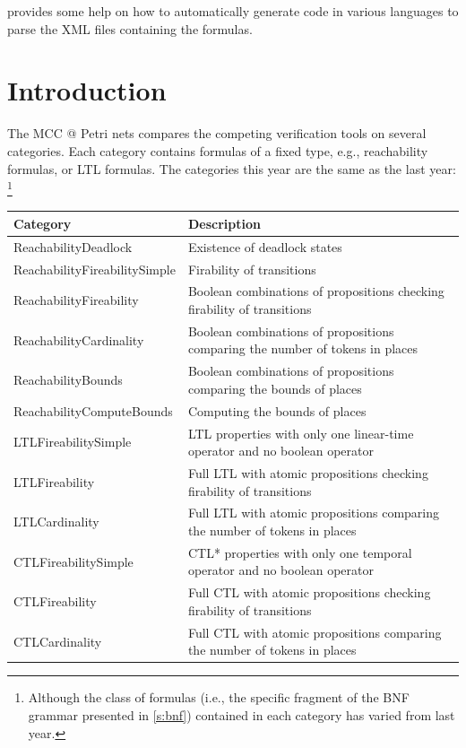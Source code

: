\documentclass[10pt,english,a4paper]{article}
\makeatletter
\newcommand\eg               {e.g.\@\xspace}
\newcommand\ie               {i.e.\@\xspace}
\newcommand{\mcc}[0]{MCC}
\makeatother
\begin{document}
 provides some help on how to automatically generate code
in various languages to parse the XML files containing the formulas.

\clearpage
\tableofcontents

\clearpage
\section{Introduction}

The \mcc{} @ Petri nets compares the competing verification tools on
several categories.
Each category contains formulas of a fixed type, \eg, reachability
formulas, or LTL formulas.
The categories this year are the same as the last year:
\footnote{Although the class of formulas (\ie, the specific fragment of the
BNF grammar presented in \cref{s:bnf}) contained in each category has
varied from last year.}

\begin{center}
\begin{tabular}{ll}
\toprule
Category                       & Description \\
\midrule
ReachabilityDeadlock           & Existence of deadlock states \\
ReachabilityFireabilitySimple  & Firability of transitions \\
ReachabilityFireability        & Boolean combinations of propositions checking firability of transitions \\
ReachabilityCardinality        & Boolean combinations of propositions comparing the number of tokens in places\\
ReachabilityBounds             & Boolean combinations of propositions comparing the bounds of places \\
ReachabilityComputeBounds      & Computing the bounds of places \\
LTLFireabilitySimple           & LTL properties with only one linear-time operator and no boolean operator \\
LTLFireability                 & Full LTL with atomic propositions checking firability of transitions \\
LTLCardinality                 & Full LTL with atomic propositions comparing the number of tokens in places \\
CTLFireabilitySimple           & CTL* properties with only one temporal operator and no boolean operator \\
CTLFireability                 & Full CTL with atomic propositions checking firability of transitions \\
CTLCardinality                 & Full CTL with atomic propositions comparing the number of tokens in places \\
\bottomrule
\end{tabular}
\end{center}
\end{document}
